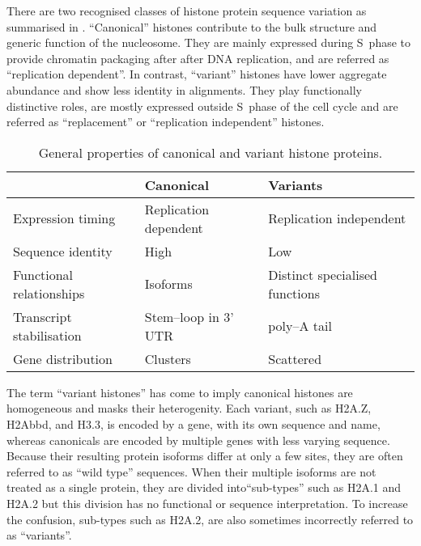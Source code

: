   There are two recognised classes of histone protein sequence variation as summarised
  in . ``Canonical'' histones contribute to the
  bulk structure and generic function of the nucleosome. They are mainly expressed
  during S~phase to provide chromatin packaging after after DNA replication,
  and are referred as ``replication dependent''. In contrast, ``variant'' histones
  have lower aggregate abundance and show less identity in alignments. They play
  functionally distinctive roles, are mostly expressed outside S~phase of the cell
  cycle and are referred as ``replacement'' or ``replication independent'' histones.

  \begin{table*}
    \caption{General properties of canonical and variant histone proteins.}
    \label{tab:typical-histone-differences}
    \centering
    \begin{tabular}{l l l}
      \toprule
      \null                     & Canonical             & Variants \\
      \midrule
      Expression timing         & Replication dependent & Replication independent \\
      Sequence identity         & High                  & Low \\
      Functional relationships  & Isoforms              & Distinct specialised functions \\
      Transcript stabilisation  & Stem--loop in 3' UTR  & poly--A tail \\
      Gene distribution         & Clusters              & Scattered \\
      \bottomrule
    \end{tabular}
  \end{table*}

  The term ``variant histones'' has come to imply canonical histones are homogeneous
  and masks their heterogenity. Each variant, such as H2A.Z, H2Abbd, and H3.3,
  is encoded by a gene, with its own sequence and name,
  whereas canonicals are encoded by multiple genes with less varying sequence.
  Because their resulting protein isoforms differ at only a few sites, they are often
  referred to as ``wild type'' sequences.
  When their multiple isoforms are not treated as a single protein, they are divided
  into``sub-types'' such as H2A.1 and H2A.2 but this division has no functional or sequence
  interpretation. To increase the confusion, sub-types such as H2A.2, are also sometimes incorrectly
  referred to as ``variants''\addref{}.

